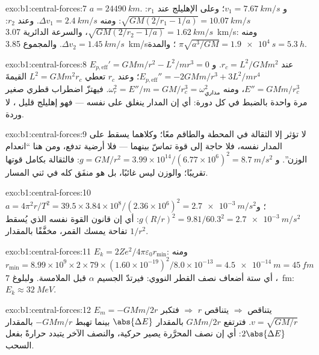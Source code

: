 \begin{solution}{exo:b1:central-forces:7}
$a = \qty{24490}{km}$. و $v_1 = \qty{7.67}{km/s}$؛ وعلى الإهليلج عند $r_1$:
$\sqrt{GM(2/r_1 - 1/a)} = \qty{10.07}{km/s}$: ومنه $\Delta v_1 = \qty{2.4}{km/s}$.
وعند $r_2$: $\sqrt{GM(2/r_2 - 1/a)} = \qty{1.62}{km/s}$، والسرعة الدائرية
\qty{3.07}{km/s}: ومنه $\Delta v_2 = \qty{1.45}{km/s}$. والمجموع \qty{3.85}{km/s}؛
والمدة $\pi\sqrt{a^3/GM} = \qty{1.9e4}{s} = \qty{5.3}{h}$.
\end{solution}

\begin{solution}{exo:b1:central-forces:8}
$E_{p,\mathrm{eff}}' = GMm/r^2 - L^2/mr^3 = 0$ عند $r_c = L^2/GMm^2$.
و $E_{p,\mathrm{eff}}'' = -2GMm/r^3 + 3L^2/mr^4$؛ وعند $r_c$ تعطي $L^2 = GMm^2r_c$
القيمةَ $E'' = GMm/r_c^3$، ومنه $\omega_r^2 = E''/m = GM/r_c^3 = \omega_{\text{مداري}}^2$.
فيهتزّ اضطراب قطري صغير مرة واحدة بالضبط في كل دورة: أي إن
المدار ينغلق على نفسه --- فهو إهليلج قليل ، لا وردة.
\end{solution}

\begin{solution}{exo:b1:central-forces:9}
لا تؤثر إلا الثقالة في المحطة والطاقم معًا؛ وكلاهما يسقط على
المدار نفسه، فلا حاجة إلى قوة تماسّ بينهما --- فلا أرضية تدفع،
ومن هنا ``انعدام الوزن''. و $g = GM/r^2 = 3.99\times10^{14}/(6.77\times10^6)^2
= \qty{8.7}{m/s^2}$: فالثقالة بكامل قوتها تقريبًا؛ والوزن ليس
غائبًا، بل هو منفَق كله في ثني المسار.
\end{solution}

\begin{solution}{exo:b1:central-forces:10}
$a = 4\pi^2r/T^2 = 39.5 \times 3.84\times10^8/(2.36\times10^6)^2 =
\qty{2.7e-3}{m/s^2}$؛ و $g(R/r)^2 = 9.81/60.3^2 = \qty{2.7e-3}{m/s^2}$: أي إن
قانون القوة نفسه الذي يُسقط تفاحة يمسك القمر، مخفَّفًا بالمقدار $1/r^2$.
\end{solution}

\begin{solution}{exo:b1:central-forces:11}
$E_k = 2Ze^2/4\pi\varepsilon_0r_{\min}$: ومنه $r_{\min} = 8.99\times10^9 \times 2 \times 79
\times (1.60\times10^{-19})^2/8.0\times10^{-13} = \qty{4.5e-14}{m} = \qty{45}{fm}$،
أي ستة أضعاف نصف القطر النووي: فيرتدّ الجسيم $\alpha$ قبل الملامسة.
ولبلوغ \qty{7}{fm}: $E_k \approx \qty{32}{MeV}$.
\end{solution}

\begin{solution}{exo:b1:central-forces:12}
$E_m = -GMm/2r$ يتناقص $\Rightarrow$ يتناقص $r$ $\Rightarrow$ فتكبر $v =
\sqrt{GM/r}$. فترتفع  $GMm/2r$ بالمقدار $\abs{\Delta E}$
بينما تهبط  $-GMm/r$ بالمقدار $2\abs{\Delta E}$: أي إن نصف
 المحرَّرة يصير حركية، والنصف الآخر يتبدد حرارةً
بفعل السحب.
\end{solution}

